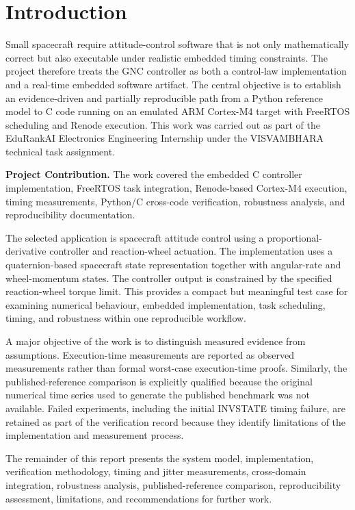 \documentclass[11pt,a4paper]{article}
\begin{document}
\section{Introduction}
Small spacecraft require attitude-control software that is not only mathematically correct but also executable under realistic embedded timing constraints. The project therefore treats the GNC controller as both a control-law implementation and a real-time embedded software artifact. The central objective is to establish an evidence-driven and partially reproducible path from a Python reference model to C code running on an emulated ARM Cortex-M4 target with FreeRTOS scheduling and Renode execution. This work was carried out as part of the EduRankAI Electronics Engineering Internship under the VISVAMBHARA technical task assignment.

\textbf{Project Contribution.} The work covered the embedded C controller implementation, FreeRTOS task integration, Renode-based Cortex-M4 execution, timing measurements, Python/C cross-code verification, robustness analysis, and reproducibility documentation.

The selected application is spacecraft attitude control using a proportional-derivative controller and reaction-wheel actuation. The implementation uses a quaternion-based spacecraft state representation together with angular-rate and wheel-momentum states. The controller output is constrained by the specified reaction-wheel torque limit. This provides a compact but meaningful test case for examining numerical behaviour, embedded implementation, task scheduling, timing, and robustness within one reproducible workflow.\par

A major objective of the work is to distinguish measured evidence from assumptions. Execution-time measurements are reported as observed measurements rather than formal worst-case execution-time proofs. Similarly, the published-reference comparison is explicitly qualified because the original numerical time series used to generate the published benchmark was not available. Failed experiments, including the initial INVSTATE timing failure, are retained as part of the verification record because they identify limitations of the implementation and measurement process.\par

The remainder of this report presents the system model, implementation, verification methodology, timing and jitter measurements, cross-domain integration, robustness analysis, published-reference comparison, reproducibility assessment, limitations, and recommendations for further work.\par
\end{document}
